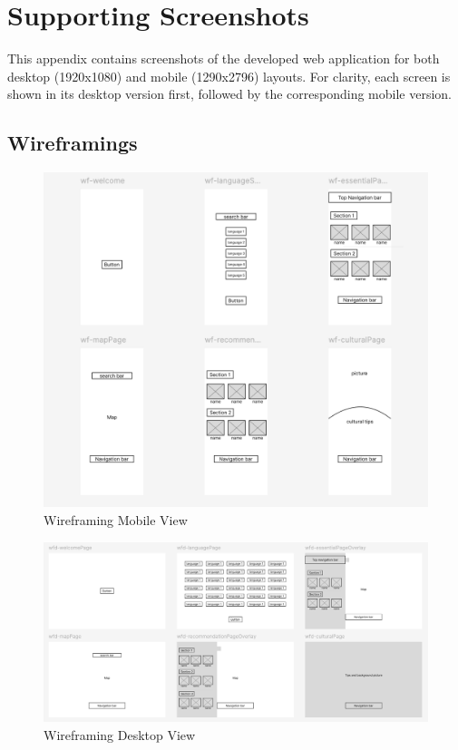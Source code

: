 \chapter{Supporting Screenshots}

This appendix contains screenshots of the developed web application for both
desktop (1920x1080) and mobile (1290x2796) layouts. For clarity, each screen
is shown in its desktop version first, followed by the corresponding mobile version.

\section{Wireframings}

\begin{figure}[H]
    \centering
    \includegraphics[height=0.3\textheight, keepaspectratio]{images/wireframing/mobileViewWireframing.png}
    \caption{Wireframing Mobile View}
    \label{fig:appendix-wireframing-mobile} 
\end{figure}

\begin{figure}[H]
    \centering
    \includegraphics[height=0.3\textheight, keepaspectratio]{images/wireframing/desktopViewWireframing.png}
    \caption{Wireframing Desktop View}
    \label{fig:appendix-wireframing-desktop} 
\end{figure}

